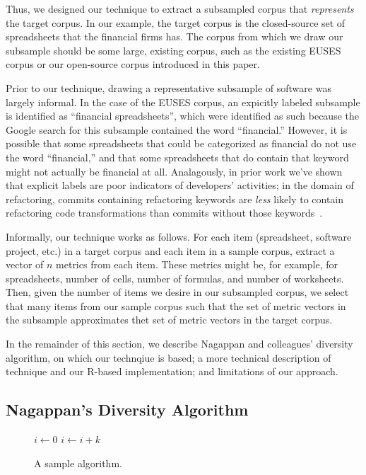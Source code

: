 \documentclass[conference]{IEEEtran}
\begin{document}
Thus, we designed our technique to extract a subsampled corpus that \emph{represents}
the target corpus.
In our example, the target corpus is the closed-source set of spreadsheets that the 
financial firms has.
The corpus from which we draw our subsample should be some large, existing corpus, such
as the existing EUSES corpus or our open-source corpus introduced in this paper.


Prior to our technique, drawing a representative subsample of software was largely
informal.
In the case of the EUSES corpus, an expicitly labeled subsample is identified as ``financial spreadsheets'',
which were identified as such because the Google search for this subsample
contained the word ``financial.''
However, it is possible that some spreadsheets that could be categorized as financial do not
use the word ``financial,'' and that some spreadsheets that do contain that keyword might not
actually be financial at all.
Analagously, in prior work we've shown that explicit labels are poor indicators of developers'
activities; in the domain of refactoring, commits containing refactoring keywords are \emph{less}
likely to contain refactoring code transformations than commits without those keywords~\cite{HowWeRefactor}.


Informally, our technique works as follows.
For each item (spreadsheet, software project, etc.) in a target corpus and each
item in a sample corpus, extract a vector of $n$ metrics from each item.
These metrics might be, for example, for spreadsheets, number of cells,
number of formulas, and number of worksheets.
Then, given the number of items we desire in our subsampled corpus,
we select that many items from our sample corpus such that
the set of metric vectors in the subsample approximates thet set
of metric vectors in the target corpus.

In the remainder of this section, we describe Nagappan and colleagues'
diversity algorithm, on which our technqiue is based; 
a more technical description of technique and our R-based implementation;
and limitations of our approach.

\subsection{Nagappan's Diversity Algorithm}

\begin{figure}[!t]
\begin{algorithmic}
    \State $i\gets 0$
\Else
        \State $i\gets i+k$
    \EndIf
\EndIf
\end{algorithmic}
\caption{A sample algorithm.}
\label{fig:algorithm}
\end{figure}
\end{document}
